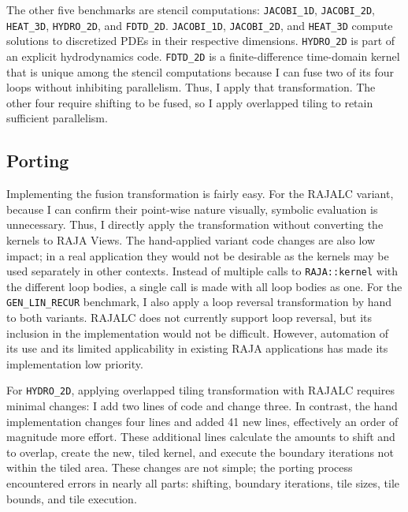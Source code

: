 The other five benchmarks are stencil computations: \verb.JACOBI_1D.,
\verb.JACOBI_2D., \verb.HEAT_3D., \verb.HYDRO_2D., and \verb.FDTD_2D..
\verb.JACOBI_1D., \verb.JACOBI_2D., and \verb.HEAT_3D. compute solutions
to discretized PDEs in their respective dimensions.
\verb.HYDRO_2D. is part of an explicit hydrodynamics code.
\verb.FDTD_2D. is a finite-difference time-domain kernel that is unique
among the stencil computations because I can fuse two of its four loops 
without inhibiting parallelism.
Thus, I apply that transformation.
The other four require shifting to be fused, so I apply overlapped tiling
to retain sufficient parallelism.

\subsection{Porting}

Implementing the fusion transformation is fairly easy. 
For the RAJALC variant, because I can confirm their point-wise nature
visually, symbolic evaluation is unnecessary.
Thus, I directly apply the transformation without converting the kernels to 
RAJA Views.
The hand-applied variant code changes are also low impact; in a real
application they would not be desirable as the kernels may be used separately
in other contexts.
Instead of multiple calls to \verb.RAJA::kernel. with the different loop
bodies, a single call is made with all loop bodies as one.
For the \verb.GEN_LIN_RECUR. benchmark, I also apply a loop reversal
transformation by hand to both variants. RAJALC does not currently support 
loop reversal, but its inclusion in the implementation would not be difficult.
However, automation of its use and its limited applicability in 
existing RAJA applications has made its implementation low priority. 

For \verb.HYDRO_2D., applying overlapped tiling transformation with RAJALC 
requires minimal changes: I add two lines of code and change three. 
In contrast, the hand implementation changes four lines and added 41
new lines, effectively an order of magnitude more effort. 
These additional lines calculate the amounts to shift and to overlap, 
create the new, tiled kernel, and execute the boundary iterations not
within the tiled area. 
These changes are not simple; the porting process encountered errors
in nearly all parts: shifting, boundary iterations, tile sizes, tile
bounds, and tile execution.

